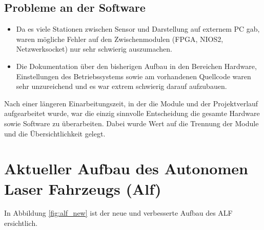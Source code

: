 



\subsection*{Probleme an der Software}

\begin{itemize}
\item Da es viele Stationen zwischen Sensor und Darstellung auf externem PC gab, waren mögliche Fehler auf den Zwischenmodulen (FPGA, NIOS2, Netzwerksocket) nur sehr schwierig auszumachen.

\item Die Dokumentation über den bisherigen Aufbau in den Bereichen Hardware, Einstellungen des Betriebssystems sowie am vorhandenen Quellcode waren sehr unzureichend und es war extrem schwierig darauf aufzubauen. 

\end{itemize}

Nach einer längeren Einarbeitungszeit, in der die Module und der Projektverlauf aufgearbeitet wurde, war die einzig sinnvolle Entscheidung die gesamte Hardware sowie Software zu überarbeiten. Dabei wurde Wert auf die Trennung der Module und die Übersichtlichkeit gelegt. 


\section{Aktueller Aufbau des Autonomen Laser Fahrzeugs (Alf)}

In Abbildung \ref{fig:alf_new} ist der neue und verbesserte Aufbau des ALF ersichtlich. 


